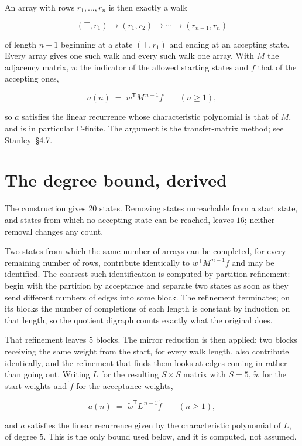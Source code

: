 \documentclass[11pt]{article}
\theoremstyle{definition}
\begin{document}
An array with rows $r_1,\dots,r_n$ is then exactly a walk

\[(\top,r_1) \to (r_1,r_2) \to \cdots \to (r_{n-1},r_n)\]

of length $n-1$ beginning at a state $(\top,r_1)$ and ending at an accepting state. Every array gives one such walk and every such walk one array. With $M$ the adjacency matrix, $w$ the indicator of the allowed starting states and $f$ that of the accepting ones,

\[a(n) \;=\; w^{\mathsf T} M^{\,n-1} f \qquad (n \ge 1),\]

so $a$ satisfies the linear recurrence whose characteristic polynomial is that of $M$, and is in particular C-finite. The argument is the transfer-matrix method; see Stanley~\S4.7.

\section{The degree bound, derived}

The construction gives $20$ states. Removing states unreachable from a start state, and states from which no accepting state can be reached, leaves $16$; neither removal changes any count.

Two states from which the same number of arrays can be completed, for every remaining number of rows, contribute identically to $w^{\mathsf T}M^{\,n-1}f$ and may be identified. The coarsest such identification is computed by partition refinement: begin with the partition by acceptance and separate two states as soon as they send different numbers of edges into some block. The refinement terminates; on its blocks the number of completions of each length is constant by induction on that length, so the quotient digraph counts exactly what the original does.

That refinement leaves $5$ blocks. The mirror reduction is then applied: two blocks receiving the same weight from the start, for every walk length, also contribute identically, and the refinement that finds them looks at edges coming in rather than going out. Writing $L$ for the resulting $S \times S$ matrix with $S = 5$, $\tilde w$ for the start weights and $\tilde f$ for the acceptance weights,

\[a(n) \;=\; \tilde w^{\mathsf T} L^{\,n-1} \tilde f \qquad (n \ge 1),\]

and $a$ satisfies the linear recurrence given by the characteristic polynomial of $L$, of degree $5$. This is the only bound used below, and it is computed, not assumed.
\end{document}
